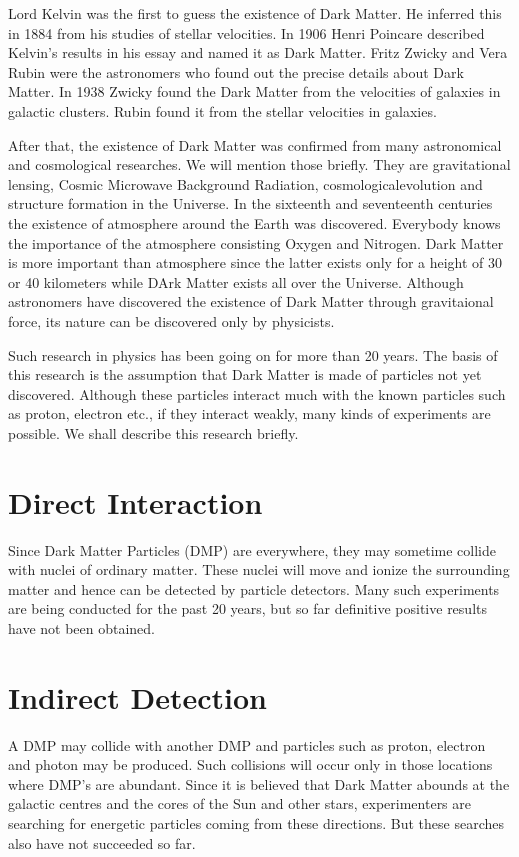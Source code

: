 Lord Kelvin was the first to guess the existence of Dark
Matter. He inferred this in 1884 from his studies of
stellar velocities. In 1906 Henri Poincare described
Kelvin's results in his essay and named it as Dark Matter.
Fritz Zwicky and Vera Rubin were the astronomers who
found out the precise details about Dark Matter. In
1938 Zwicky found the Dark Matter from the velocities
of galaxies in galactic clusters. Rubin found it from
the stellar velocities in galaxies.

After that, the existence of Dark Matter was confirmed
from many astronomical and cosmological researches. We
will mention those briefly. They are gravitational lensing,
Cosmic Microwave Background Radiation, cosmologicalevolution and structure formation in the Universe.
In the sixteenth and seventeenth centuries the existence
of atmosphere around the Earth was discovered. Everybody
knows the importance of the atmosphere consisting Oxygen
and Nitrogen. Dark Matter is more important than atmosphere
since the latter exists only for a height of 30 or 40
kilometers while DArk Matter exists all over the Universe.
Although astronomers have discovered the existence of Dark
Matter through gravitaional force, its nature can be discovered
only by physicists.

Such research in physics has been going on for more than
20 years. The basis of this research is the assumption that
Dark Matter is made of particles not yet discovered. Although
these particles interact much with the known particles
such as proton, electron etc., if they interact weakly,
many kinds of experiments are possible. We shall describe
this research briefly.

\section{Direct Interaction}

Since Dark Matter Particles (DMP) are everywhere, they may
sometime collide with nuclei of ordinary matter. These
nuclei will move and ionize the surrounding matter and hence
can be detected by particle detectors. Many such experiments
are being conducted for the past 20 years, but so far definitive
positive results have not been obtained.

\section{Indirect Detection}

A DMP may collide with another DMP and particles such as proton,
electron and photon may be produced. Such collisions will occur
only in those locations where DMP's are abundant. Since it is
believed that Dark Matter abounds at the galactic centres and
the cores of the Sun and other stars, experimenters are searching
for energetic particles coming from these directions. But these
searches also have not succeeded so far.


